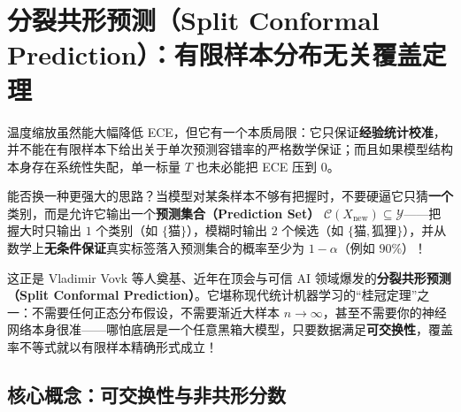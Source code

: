 \section{分裂共形预测（Split Conformal Prediction）：有限样本分布无关覆盖定理}

温度缩放虽然能大幅降低 ECE，但它有一个本质局限：它只保证\textbf{经验统计校准}，并不能在有限样本下给出关于单次预测容错率的严格数学保证；而且如果模型结构本身存在系统性失配，单一标量 $T$ 也未必能把 ECE 压到 $0$。

能否换一种更强大的思路？当模型对某条样本不够有把握时，不要硬逼它只猜\textbf{一个}类别，而是允许它输出一个\textbf{预测集合（Prediction Set）} $\mathcal{C}(X_{\text{new}}) \subseteq \mathcal{Y}$——把握大时只输出 $1$ 个类别（如 $\{\text{猫}\}$），模糊时输出 $2$ 个候选（如 $\{\text{猫}, \text{狐狸}\}$），并从数学上\textbf{无条件保证}真实标签落入预测集合的概率至少为 $1 - \alpha$（例如 $90\%$）！

这正是 Vladimir Vovk 等人奠基、近年在顶会与可信 AI 领域爆发的\textbf{分裂共形预测（Split Conformal Prediction）}。它堪称现代统计机器学习的“桂冠定理”之一：不需要任何正态分布假设，不需要渐近大样本 $n \to \infty$，甚至不需要你的神经网络本身很准——哪怕底层是一个任意黑箱大模型，只要数据满足\textbf{可交换性}，覆盖率不等式就以有限样本精确形式成立！

\subsection{核心概念：可交换性与非共形分数}


